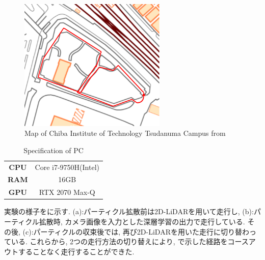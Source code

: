 \documentclass[uplatex, twocolumn, 9pt]{jsproceedings}
\begin{document}
\begin{figure}[h]
  \centering
  \includegraphics[width=70mm]{fig/tsudanuma-seg.pdf}
  \caption{Map of Chiba Institute of Technology Tsudanuma Campus from \cite{tsudanuma}}
  \label{fig:tsudanuma}%
\end{figure}

\begin{table}[h]
  \centering
  \caption{Specification of PC}
  \label{table:pc}
  \begin{tabular}{cc}
  \toprule%
  \textbf{CPU} & Core i7-9750H(Intel)\\
  \textbf{RAM} & 16GB\\
  \textbf{GPU} & RTX 2070 Max-Q\\
  \bottomrule%
  \end{tabular}
\end{table}

\newpage
実験の様子をに示す. (a):パーティクル拡散前は2D-LiDARを用いて走行し, (b):パーティクル拡散時, カメラ画像を入力とした深層学習の出力で走行している. その後, (c):パーティクルの収束後では, 再び2D-LiDARを用いた走行に切り替わっている. これらから, 2つの走行方法の切り替えにより, \cite{tsudanuma}で示した経路をコースアウトすることなく走行することができた. 
\end{document}
